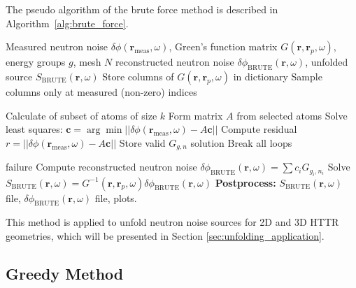 The pseudo algorithm of the brute force method is described in Algorithm~\ref{alg:brute_force}.
\begin{algorithm}[H]
\caption{: Brute Force Method}
\label{alg:brute_force}
\begin{algorithmic}[1]
\Require Measured neutron noise $\delta \phi(\textbf{r}_{\text{meas}}, \omega)$, Green’s function matrix $G(\textbf{r}, \textbf{r}_p,\omega)$, energy groups $g$, mesh $N$
\Ensure reconstructed neutron noise $\delta \phi_{\text{BRUTE}}(\textbf{r}, \omega)$, unfolded source $S_{\text{BRUTE}}(\textbf{r}, \omega)$
 
        \State Store columns of $G(\textbf{r}, \textbf{r}_p,\omega)$ in dictionary
    \EndFor
\EndFor
\State Sample columns only at measured (non-zero) indices

 
    \State Calculate of subset of atoms of size $k$
        \State Form matrix $A$ from selected atoms
        \State Solve least squares: $\mathbf{c} = \arg\min || \delta \phi(\textbf{r}_{\text{meas}}, \omega) - A \mathbf{c}||$
        \State Compute residual $r = ||\delta \phi(\textbf{r}_{\text{meas}}, \omega) - A \mathbf{c}||$
            \State Store valid $G_{g,n}$ solution
            \State Break all loops
        \EndIf
    \EndFor
\EndFor

    \State \Return failure
\EndIf
\State Compute reconstructed neutron noise $\delta \phi_\text{BRUTE}(\textbf{r}, \omega) = \sum c_i G_{g_i,n_i}$ 
\State Solve $S_{\text{BRUTE}}(\textbf{r}, \omega) = G^{-1}(\textbf{r}, \textbf{r}_p,\omega) \delta \phi_\text{BRUTE}(\textbf{r}, \omega)$
\State \textbf{Postprocess:} $S_{\text{BRUTE}}(\textbf{r}, \omega)$ file, $\delta \phi_\text{BRUTE}(\textbf{r}, \omega)$ file, plots. 
\end{algorithmic}
\end{algorithm}

This method is applied to unfold neutron noise sources for 2D and 3D HTTR geometries, which will be presented in Section \ref{sec:unfolding_application}.

\subsection{Greedy Method}

